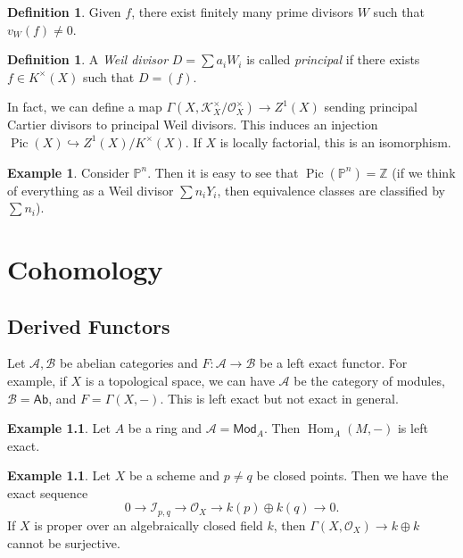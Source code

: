 \documentclass[leqno, openany]{memoir}
\theoremstyle{definition}
\newtheorem{defn}[thm]{Definition}
\newtheorem{exm}[thm]{Example}
\theoremstyle{remark}
\theoremstyle{plain}
\theoremstyle{definition}
\theoremstyle{remark}
\newcommand{\Z}{\mathbb{Z}}
\renewcommand{\P}{\mathbb{P}}
\newcommand{\mc}[1]{\mathcal{#1}}
\newcommand{\ms}[1]{\mathsf{#1}}
\DeclareMathOperator{\Hom}{Hom}
\DeclareMathOperator{\Pic}{Pic}
\begin{document}
\begin{defn} Given $f$, there exist finitely many prime divisors $W$ such that
$v_W(f) \neq 0$.  \end{defn}

\begin{defn} A \textit{Weil divisor} $D = \sum a_i W_i$ is called
\textit{principal} if there exists $f \in K^{\times}(X)$ such that $D = (f)$.
\end{defn}

In fact, we can define a map $\Gamma(X, \mc{K}_X^{\times} / \mc{O}_X^{\times})
\to Z^1(X)$ sending principal Cartier divisors to principal Weil divisors. This
induces an injection $\Pic(X) \hookrightarrow Z^1(X)/K^{\times}(X)$. If $X$ is
locally factorial, this is an isomorphism.

\begin{exm} Consider $\P^n$. Then it is easy to see that $\Pic(\P^n) = \Z$ (if
we think of everything as a Weil divisor $\sum n_i Y_i$, then equivalence
classes are classified by $\sum n_i$).  \end{exm}

\chapter{Cohomology}%

\section{Derived Functors}%

Let $\mc{A}, \mc{B}$ be abelian categories and $F \colon \mc{A} \to \mc{B}$ be
a left exact functor. For example, if $X$ is a topological space, we can have
$\mc{A}$ be the category of modules, $\mc{B} = \ms{Ab}$, and $F = \Gamma(X,-)$.
This is left exact but not exact in general.

\begin{exm} Let $A$ be a ring and $\mc{A} = \ms{Mod}_A$. Then $\Hom_A(M,-)$ is
left exact.  \end{exm}

\begin{exm} Let $X$ be a scheme and $p \neq q$ be closed points. Then we have
    the exact sequence \[ 0 \to \mc{I}_{p,q} \to \mc{O}_X \to k(p) \oplus k(q)
    \to 0. \] If $X$ is proper over an algebraically closed field $k$, then
    $\Gamma(X, \mc{O}_X) \to k \oplus k$ cannot be surjective.  \end{exm}
\end{document}
